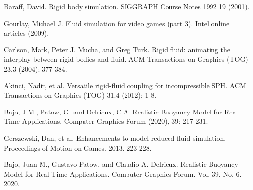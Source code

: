\begin{thebibliography}{99}
	Baraff, David.
	Rigid body simulation.
	SIGGRAPH Course Notes 1992 19 (2001).

	Gourlay, Michael J.
	Fluid simulation for video games (part 3).
	Intel online articles (2009).

	Carlson, Mark, Peter J. Mucha, and Greg Turk.
	Rigid fluid: animating the interplay between rigid bodies and fluid.
	ACM Transactions on Graphics (TOG) 23.3 (2004): 377-384.

	Akinci, Nadir, et al.
	Versatile rigid-fluid coupling for incompressible SPH.
	ACM Transactions on Graphics (TOG) 31.4 (2012): 1-8.

	Bajo, J.M., Patow, G. and Delrieux, C.A.
	Realistic Buoyancy Model for Real-Time Applications.
	Computer Graphics Forum (2020), 39: 217-231.

	Gerszewski, Dan, et al.
	Enhancements to model-reduced fluid simulation.
	Proceedings of Motion on Games. 2013. 223-228.

	Bajo, Juan M., Gustavo Patow, and Claudio A. Delrieux.
	Realistic Buoyancy Model for Real‐Time Applications.
	Computer Graphics Forum. Vol. 39. No. 6. 2020.
\end{thebibliography}